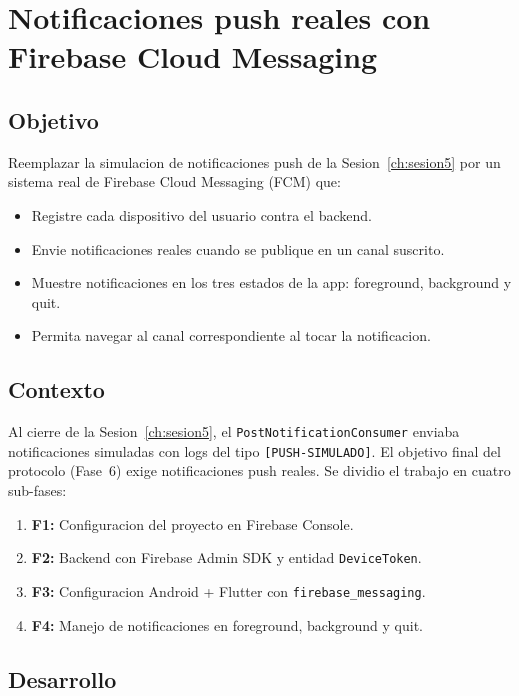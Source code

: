 \chapter{Notificaciones push reales con Firebase Cloud Messaging}
\label{ch:fcm}

\section{Objetivo}

Reemplazar la simulacion de notificaciones push de la Sesion~\ref{ch:sesion5} por un sistema real de Firebase Cloud Messaging (FCM) que:

\begin{itemize}[leftmargin=*]
  \item Registre cada dispositivo del usuario contra el backend.
  \item Envie notificaciones reales cuando se publique en un canal suscrito.
  \item Muestre notificaciones en los tres estados de la app: foreground, background y quit.
  \item Permita navegar al canal correspondiente al tocar la notificacion.
\end{itemize}

\section{Contexto}

Al cierre de la Sesion~\ref{ch:sesion5}, el \texttt{PostNotificationConsumer} enviaba notificaciones simuladas con logs del tipo \texttt{[PUSH-SIMULADO]}. El objetivo final del protocolo (Fase~6) exige notificaciones push reales. Se dividio el trabajo en cuatro sub-fases:

\begin{enumerate}[leftmargin=*]
  \item \textbf{F1:} Configuracion del proyecto en Firebase Console.
  \item \textbf{F2:} Backend con Firebase Admin SDK y entidad \texttt{DeviceToken}.
  \item \textbf{F3:} Configuracion Android + Flutter con \texttt{firebase\_messaging}.
  \item \textbf{F4:} Manejo de notificaciones en foreground, background y quit.
\end{enumerate}

\section{Desarrollo}

